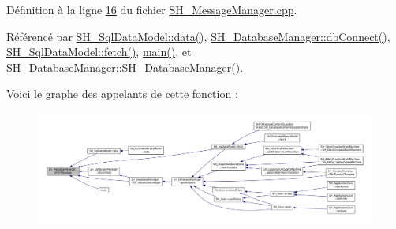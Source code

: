 Définition à la ligne \hyperlink{SH__MessageManager_8cpp_source_l00016}{16} du fichier \hyperlink{SH__MessageManager_8cpp_source}{S\-H\-\_\-\-Message\-Manager.\-cpp}.



Référencé par \hyperlink{classSH__SqlDataModel_a30cc763618d73a1bb5410c84812c0b9f}{S\-H\-\_\-\-Sql\-Data\-Model\-::data()}, \hyperlink{classSH__DatabaseManager_aeb077fe5437f435c0cbe8d77d96dd846}{S\-H\-\_\-\-Database\-Manager\-::db\-Connect()}, \hyperlink{classSH__SqlDataModel_a8d9b08d282a304945b9ee2f474020980}{S\-H\-\_\-\-Sql\-Data\-Model\-::fetch()}, \hyperlink{main_8cpp_a3c04138a5bfe5d72780bb7e82a18e627}{main()}, et \hyperlink{classSH__DatabaseManager_a7b5d0e372c153eb59cdab98588994904}{S\-H\-\_\-\-Database\-Manager\-::\-S\-H\-\_\-\-Database\-Manager()}.




Voici le graphe des appelants de cette fonction \-:
\nopagebreak
\begin{figure}[H]
\begin{center}
\leavevmode
\includegraphics[width=350pt]{classSH__MessageManager_acb5615cc90f198f4768da800a5d32362_icgraph}
\end{center}
\end{figure}


